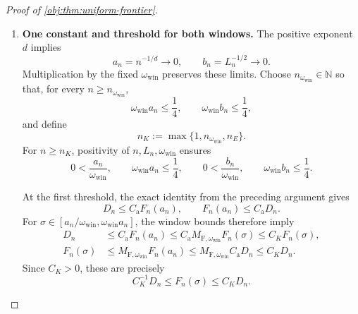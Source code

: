 \begin{proof}[Proof of \cref{obj:thm:uniform-frontier}]
\begin{enumerate}
Now let \(n\ge1\), \(\varrho>0\), and
\(\sigma\in[\varrho/\omega_{\mathrm{win}},\omega_{\mathrm{win}}\varrho]\). Both
\(\sigma\le \omega_{\mathrm{win}}\varrho\) and \(\varrho\le \omega_{\mathrm{win}}\sigma\) hold.
Applying the square-root comparison in both directions with
\(\gamma=d\) and \(\omega_{\log}=n\) gives
\[
\begin{aligned}
F_n(\sigma)
&=
\frac{\sigma}{\varrho}
\frac{\sqrt{\log(e+n\varrho^d)}}
     {\sqrt{\log(e+n\sigma^d)}}F_n(\varrho)
\le M_{\mathrm F,\omega_{\mathrm{win}}}F_n(\varrho),\\
F_n(\varrho)
&=
\frac{\varrho}{\sigma}
\frac{\sqrt{\log(e+n\sigma^d)}}
     {\sqrt{\log(e+n\varrho^d)}}F_n(\sigma)
\le M_{\mathrm F,\omega_{\mathrm{win}}}F_n(\sigma).
\end{aligned}
\]
Applying the logarithmic comparison in both directions with
\(\gamma=2\) and \(\omega_{\log}=L_n>0\), and dividing by \(L_n\), gives
\[
P_n(\sigma)\le M_{\mathrm P,\omega_{\mathrm{win}}}P_n(\varrho),
\qquad
P_n(\varrho)\le M_{\mathrm P,\omega_{\mathrm{win}}}P_n(\sigma).
\]
Thus both scales vary by the stated fixed factors throughout any such radius window.

\item \textbf{One constant and threshold for both windows.}
The positive exponent \(d\) implies
\[
a_n=n^{-1/d}\longrightarrow0,
\qquad
b_n=L_n^{-1/2}\longrightarrow0.
\]
Multiplication by the fixed \(\omega_{\mathrm{win}}\) preserves these limits. Choose
\(n_{\omega_{\mathrm{win}}}\in\mathbb N\) so that, for every \(n\ge n_{\omega_{\mathrm{win}}}\),
\[
\omega_{\mathrm{win}}a_n\le\frac14,\qquad \omega_{\mathrm{win}}b_n\le\frac14,
\]
and define
\[
n_K:=\max\{1,n_{\omega_{\mathrm{win}}},n_E\}.
\]
For \(n\ge n_K\), positivity of \(n,L_n,\omega_{\mathrm{win}}\) ensures
\[
0<\frac{a_n}{\omega_{\mathrm{win}}},\qquad
\omega_{\mathrm{win}}a_n\le\frac14,\qquad
0<\frac{b_n}{\omega_{\mathrm{win}}},\qquad
\omega_{\mathrm{win}}b_n\le\frac14.
\]

At the first threshold, the exact identity from the preceding argument gives
\[
D_n\le C_{\mathrm a}F_n(a_n),
\qquad
F_n(a_n)\le C_{\mathrm a}D_n.
\]
For \(\sigma\in[a_n/\omega_{\mathrm{win}},\omega_{\mathrm{win}}a_n]\), the window bounds therefore imply
\[
\begin{aligned}
D_n
&\le C_{\mathrm a}F_n(a_n)
\le C_{\mathrm a}M_{\mathrm F,\omega_{\mathrm{win}}}F_n(\sigma)
\le C_KF_n(\sigma),\\
F_n(\sigma)
&\le M_{\mathrm F,\omega_{\mathrm{win}}}F_n(a_n)
\le M_{\mathrm F,\omega_{\mathrm{win}}}C_{\mathrm a}D_n
\le C_KD_n.
\end{aligned}
\]
Since \(C_K>0\), these are precisely
\[
C_K^{-1}D_n\le F_n(\sigma)\le C_KD_n.
\]


\end{enumerate}
\end{proof}
